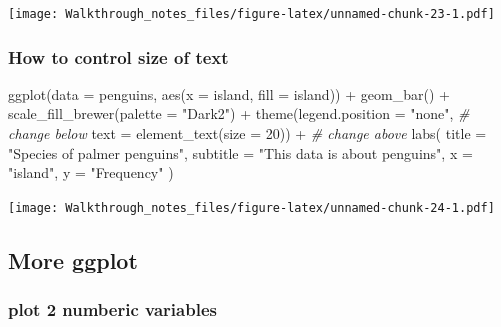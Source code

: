 \documentclass[
]{article}
\newenvironment{Shaded}{\begin{snugshade}}{\end{snugshade}}
\newcommand{\AttributeTok}[1]{\textcolor[rgb]{0.77,0.63,0.00}{#1}}
\newcommand{\CommentTok}[1]{\textcolor[rgb]{0.56,0.35,0.01}{\textit{#1}}}
\newcommand{\DecValTok}[1]{\textcolor[rgb]{0.00,0.00,0.81}{#1}}
\newcommand{\FunctionTok}[1]{\textcolor[rgb]{0.00,0.00,0.00}{#1}}
\newcommand{\NormalTok}[1]{#1}
\newcommand{\SpecialCharTok}[1]{\textcolor[rgb]{0.00,0.00,0.00}{#1}}
\newcommand{\StringTok}[1]{\textcolor[rgb]{0.31,0.60,0.02}{#1}}
\begin{document}
\texttt{[image: Walkthrough\_notes\_files/figure-latex/unnamed-chunk-23-1.pdf]}

\hypertarget{how-to-control-size-of-text}{%
\subsubsection{How to control size of
text}\label{how-to-control-size-of-text}}

\begin{Shaded}
\begin{Highlighting}[]
\FunctionTok{ggplot}\NormalTok{(}\AttributeTok{data =}\NormalTok{ penguins, }\FunctionTok{aes}\NormalTok{(}\AttributeTok{x =}\NormalTok{ island, }
                            \AttributeTok{fill =}\NormalTok{ island)) }\SpecialCharTok{+} 
  \FunctionTok{geom\_bar}\NormalTok{() }\SpecialCharTok{+} 
    \FunctionTok{scale\_fill\_brewer}\NormalTok{(}\AttributeTok{palette =} \StringTok{"Dark2"}\NormalTok{) }\SpecialCharTok{+}
  \FunctionTok{theme}\NormalTok{(}\AttributeTok{legend.position =} \StringTok{"none"}\NormalTok{, }
\CommentTok{\# change below        }
        \AttributeTok{text =} \FunctionTok{element\_text}\NormalTok{(}\AttributeTok{size =} \DecValTok{20}\NormalTok{)) }\SpecialCharTok{+}
\CommentTok{\# change above}
  \FunctionTok{labs}\NormalTok{(}
    \AttributeTok{title =} \StringTok{"Species of palmer penguins"}\NormalTok{, }
    \AttributeTok{subtitle =} \StringTok{"This data is about penguins"}\NormalTok{, }
    \AttributeTok{x =} \StringTok{"island"}\NormalTok{, }
    \AttributeTok{y =} \StringTok{"Frequency"}
\NormalTok{  )}
\end{Highlighting}
\end{Shaded}

\texttt{[image: Walkthrough\_notes\_files/figure-latex/unnamed-chunk-24-1.pdf]}

\hypertarget{more-ggplot}{%
\subsection{More ggplot}\label{more-ggplot}}

\hypertarget{plot-2-numberic-variables}{%
\subsubsection{plot 2 numberic
variables}\label{plot-2-numberic-variables}}
\end{document}
